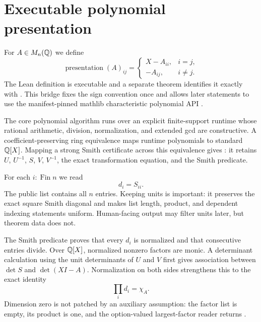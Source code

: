 \section{Executable polynomial presentation}

For $A\in M_n(\mathbb{Q})$ we define
\[
  \operatorname{presentation}(A)_{ij} =
  \begin{cases}
    X-A_{ii}, & i=j,\\
    -A_{ij}, & i\ne j.
  \end{cases}
\]
The Lean definition  is executable and a
separate theorem identifies it exactly with
.  This bridge fixes the sign convention once and
allows later statements to use the manifest-pinned mathlib characteristic
polynomial API \citep{mathlib4320charmatrix}.

The core polynomial algorithm runs over an explicit finite-support runtime
whose rational arithmetic, division, normalization, and extended gcd are
constructive.  A coefficient-preserving ring equivalence maps runtime
polynomials to standard $\mathbb{Q}[X]$.  Mapping a strong Smith certificate across
this equivalence gives
: it retains $U$, $U^{-1}$, $S$, $V$, $V^{-1}$,
the exact transformation equation, and the Smith predicate.

For each $i:\operatorname{Fin} n$ we read
\[
  d_i = S_{ii}.
\]
The public list  contains all $n$ entries.
Keeping units is important: it preserves the exact square Smith diagonal and
makes list length, product, and dependent indexing statements uniform.
Human-facing output may filter units later, but theorem data does not.

The Smith predicate proves that every $d_i$ is normalized and that consecutive
entries divide.  Over $\mathbb{Q}[X]$, normalized nonzero factors are monic.  A
determinant calculation using the unit determinants of $U$ and $V$ first gives
association between $\det S$ and $\det(XI-A)$.  Normalization on both sides
strengthens this to the exact identity
\[
  \prod_i d_i = \chi_A.
\]
Dimension zero is not patched by an auxiliary assumption: the factor list is
empty, its product is one, and the option-valued largest-factor reader returns
.
